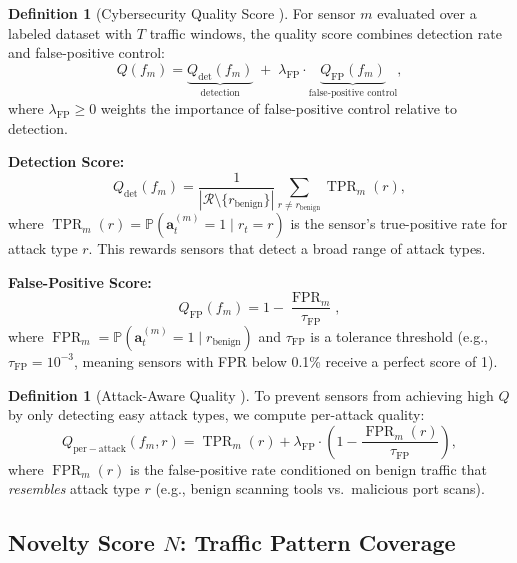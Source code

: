 \documentclass[11pt,a4paper]{article}
\theoremstyle{definition}
\newtheorem{definition}[theorem]{Definition}
\theoremstyle{remark}
\DeclareMathOperator{\TPR}{TPR}
\DeclareMathOperator{\FPR}{FPR}
\newcommand{\Pbb}{\mathbb{P}}
\newcommand{\FP}{\mathrm{FP}}
\newcommand{\alertvec}{\mathbf{a}}
\begin{document}
\begin{definition}[Cybersecurity Quality Score ]
\label{def:Q_cyber}
For sensor $m$ evaluated over a labeled dataset with $T$ traffic windows, the quality score combines detection rate and false-positive control:
\begin{equation}
Q(f_m) = \underbrace{Q_{\mathrm{det}}(f_m)}_{\text{detection}} \;+\; \lambda_{\FP} \cdot \underbrace{Q_{\FP}(f_m)}_{\text{false-positive control}},
\label{eq:Q_cyber}
\end{equation}
where $\lambda_{\FP} \geq 0$ weights the importance of false-positive control relative to detection.

\textbf{Detection Score:}
\begin{equation}
Q_{\mathrm{det}}(f_m) = \frac{1}{|\mathcal{R} \setminus \{r_{\mathrm{benign}}\}|} \sum_{r \neq r_{\mathrm{benign}}} \TPR_m(r),
\label{eq:Q_det}
\end{equation}
where $\TPR_m(r) = \Pbb(\alertvec_t^{(m)} = 1 \mid r_t = r)$ is the sensor's true-positive rate for attack type $r$. This rewards sensors that detect a broad range of attack types.

\textbf{False-Positive Score:}
\begin{equation}
Q_{\FP}(f_m) = 1 - \frac{\FPR_m}{\tau_{\FP}},
\label{eq:Q_FP}
\end{equation}
where $\FPR_m = \Pbb(\alertvec_t^{(m)} = 1 \mid r_{\mathrm{benign}})$ and $\tau_{\FP}$ is a tolerance threshold (e.g., $\tau_{\FP} = 10^{-3}$, meaning sensors with FPR below 0.1\% receive a perfect score of 1).
\end{definition}

\begin{definition}[Attack-Aware Quality ]
\label{def:Q_attack}
To prevent sensors from achieving high $Q$ by only detecting easy attack types, we compute per-attack quality:
\begin{equation}
Q_{\mathrm{per-attack}}(f_m, r) = \TPR_m(r) + \lambda_{\FP} \cdot \left(1 - \frac{\FPR_m(r)}{\tau_{\FP}}\right),
\label{eq:Q_per_attack}
\end{equation}
where $\FPR_m(r)$ is the false-positive rate conditioned on benign traffic that \textit{resembles} attack type $r$ (e.g., benign scanning tools vs.\ malicious port scans).
\end{definition}

\subsection{Novelty Score $N$: Traffic Pattern Coverage }
\end{document}
